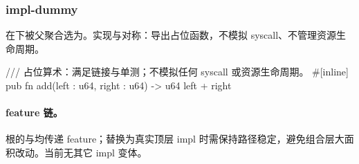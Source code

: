 
\subsubsection{impl-dummy}

在下被父聚合选为。实现与对称：导出占位函数，不模拟 syscall、不管理资源生命周期。

\begin{rustcode}
/// 占位算术：满足链接与单测；不模拟任何 syscall 或资源生命周期。
#[inline]
pub fn add(left : u64, right : u64) -> u64 { left + right }
\end{rustcode}

\paragraph{feature 链。}
根的与均传递 feature；替换为真实顶层 impl 时需保持路径稳定，避免组合层大面积改动。当前无其它 impl 变体。
